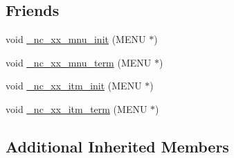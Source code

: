 \subsection*{Friends}
\begin{DoxyCompactItemize}
\item 
void \hyperlink{class_n_curses_menu_ac09565d530a268a77b10fb25050f0d9c}{\-\_\-nc\-\_\-xx\-\_\-mnu\-\_\-init} (M\-E\-N\-U $\ast$)
\item 
void \hyperlink{class_n_curses_menu_a2a959ceaa2ca294d448a5275907f1391}{\-\_\-nc\-\_\-xx\-\_\-mnu\-\_\-term} (M\-E\-N\-U $\ast$)
\item 
void \hyperlink{class_n_curses_menu_a0a5f69b20c98e89ed899fc82392c0c2a}{\-\_\-nc\-\_\-xx\-\_\-itm\-\_\-init} (M\-E\-N\-U $\ast$)
\item 
void \hyperlink{class_n_curses_menu_a9fcdbf140e452d8c5158a9ca1b70e8ad}{\-\_\-nc\-\_\-xx\-\_\-itm\-\_\-term} (M\-E\-N\-U $\ast$)
\end{DoxyCompactItemize}
\subsection*{Additional Inherited Members}


